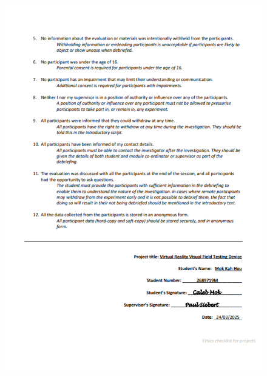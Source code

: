 \documentclass{l4proj}
\begin{document}
\begin{appendices}
\begin{figure}
    \centering
    \includegraphics[width=1\linewidth]{images//Ethics form/p2.png}
\end{figure}
\clearpage


\end{appendices}
\end{document}
